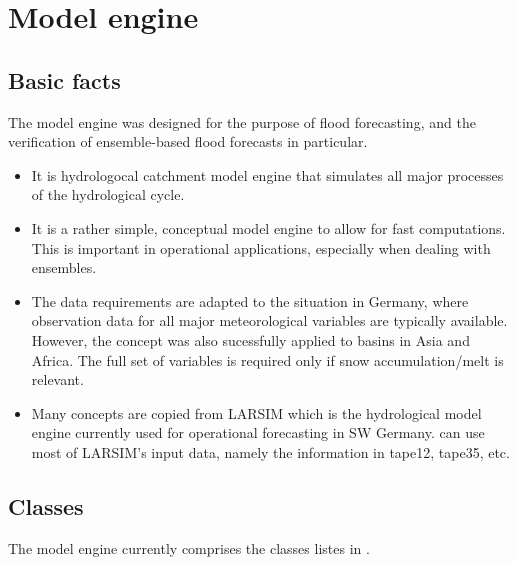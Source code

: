 \chapter{Model engine } \label{chap:hypsoRR}
\renewcommand{\tabdir}{chapters/part_modelEngines/hypsoRR/tab}
\renewcommand{\figdir}{chapters/part_modelEngines/hypsoRR/fig}

\section{Basic facts}
The  model engine was designed for the purpose of flood forecasting, and the verification of ensemble-based flood forecasts in particular.
\begin{itemize}
  \item It is hydrologocal catchment model engine that simulates all major processes of the hydrological cycle.
  \item It is a rather simple, conceptual model engine to allow for fast computations. This is important in operational applications, especially when dealing with ensembles.
  \item The data requirements are adapted to the situation in Germany, where observation data for all major meteorological variables are typically available. However, the concept was also sucessfully applied to basins in Asia and Africa. The full set of variables is required only if snow accumulation/melt is relevant.
  \item Many concepts are copied from LARSIM \citep{Ludwig2006} which is the hydrological model engine currently used for operational forecasting in SW Germany.  can use most of LARSIM's input data, namely the information in tape12, tape35, etc.
\end{itemize}

\section{Classes}
The  model engine currently comprises the classes listes in .

